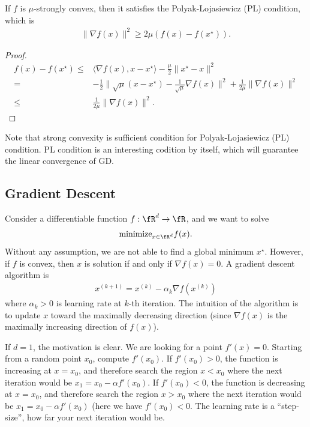 \documentclass{article}
\begin{document}
\begin{lemma}
    If $f$ is $\mu$-strongly convex, then it satisfies the Polyak-Lojasiewicz (PL) condition, which is
    \begin{align}
        \|\nabla f(x) \|^2 \geq 2\mu (f(x) - f(x^\star)).
    \end{align}
\end{lemma}
\begin{proof}
    \begin{align}
        f(x) - f(x^\star)\leq& \langle \nabla f(x), x- x^\star\rangle -\frac{\mu}{2} \|x^\star - x\|^2\\
        =& -\frac{1}{2} \|\sqrt{\mu}(x-x^\star) - \frac{1}{\sqrt{\mu}} \nabla f(x)\|^2 + \frac{1}{2\mu} \|\nabla f(x)\|^2\\
        \leq & \frac{1}{2\mu}\|\nabla f(x)\|^2.
    \end{align}
\end{proof}
Note that strong convexity is sufficient condition for Polyak-Lojasiewicz (PL) condition.
PL condition is an interesting codition by itself, which will guarantee the linear convergence of GD.



\subsection{Gradient Descent}


Consider a differentiable function $f:\fR^d \rightarrow \fR$, and we want to solve
\begin{align}
    \mbox{minimize}_{x\in\fR^d} f(x).
\end{align}
Without any assumption, we are not able to find a global minimum $x^\star$.
However, if $f$ is convex, then $x$ is solution if and only if $\nabla f(x) = 0$.
A gradient descent algorithm is
\begin{align}
    x^{(k+1)} = x^{(k)} - \alpha_k \nabla f (x^{(k)})
\end{align}
where $\alpha_k>0$ is learning rate at $k$-th iteration.
The intuition of the algorithm is to update $x$ toward the maximally decreasing direction (since $\nabla f(x)$ is the maximally increasing direction of $f(x)$).

\begin{remark}
    If $d=1$, the motivation is clear.
    We are looking for a point $f'(x)=0$.
    Starting from a random point $x_0$, compute $f'(x_0)$.
    If $f'(x_0) > 0$, the function is increasing at $x=x_0$, and therefore search the region $x < x_0$ where the next iteration would be $x_1 = x_0 - \alpha f'(x_0)$.
    If $f'(x_0) < 0$, the function is decreasing at $x=x_0$, and therefore search the region $x > x_0$ where the next iteration would be $x_1 = x_0 - \alpha f'(x_0)$ (here we have $f'(x_0)<0$.
    The learning rate is a ``step-size'', how far your next iteration would be.
\end{remark}
\end{document}
